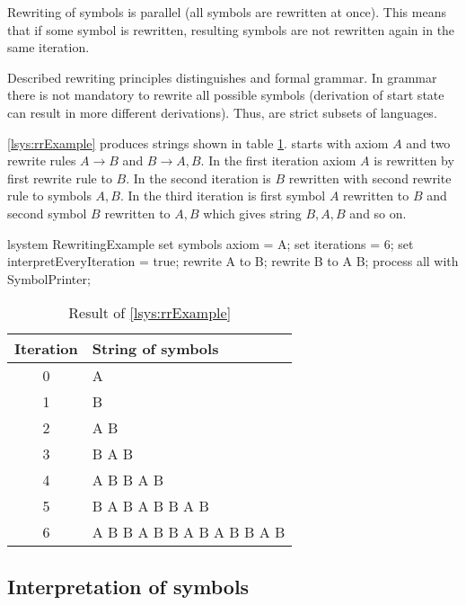 Rewriting of symbols is parallel (all symbols are rewritten at once).
This means that if some symbol is rewritten, resulting symbols are not rewritten again in the same iteration.

Described rewriting principles distinguishes \lsystem and formal grammar.
In grammar there is not mandatory to rewrite all possible symbols (derivation of start state can result in more different derivations).
Thus, \lsystems are strict subsets of languages.

\lsystem \ref{lsys:rrExample} produces strings shown in table \ref{fig:rrExampleResult}.
\lsystem starts with axiom $A$ and two rewrite rules $A \rightarrow B$ and $B \rightarrow A, B$.
In the first iteration axiom $A$ is rewritten by first rewrite rule to $B$.
In the second iteration is $B$ rewritten with second rewrite rule to symbols $A, B$.
In the third iteration is first symbol $A$ rewritten to $B$ and second symbol $B$ rewritten to $A, B$ which gives string $B, A, B$ and so on.

\begin{Lsystem}[label=lsys:rrExample,caption={Simple \lsystem as example of rewriting principles}]
lsystem RewritingExample {
	set symbols axiom = A;
	set iterations = 6;
	set interpretEveryIteration = true;
	rewrite A to B;
	rewrite B to A B;
}
process all with SymbolPrinter;
\end{Lsystem}

\begin{table}[ht]
	\centering
	\begin{tabular}{c l}
   		\toprule
   		Iteration & String of symbols \\
   		\midrule
		0 & A \\
		1 & B \\
		2 & A B \\
		3 & B A B \\
		4 & A B B A B \\
		5 & B A B A B B A B \\
		6 & A B B A B B A B A B B A B \\
		\bottomrule
	\end{tabular}
	\caption{Result of \lsystem \ref{lsys:rrExample}}
	\label{fig:rrExampleResult}
\end{table}


\subsection{Interpretation of \lsystem symbols}

